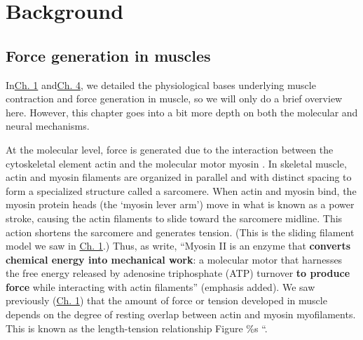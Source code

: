 \documentclass{article}
\begin{document}
\section{Background}

\subsection{Force generation in muscles}

In\href{https://curvenote.com/oxa:EPpXta8zJdzN048lz8AR/hZTnTYzQR5EQmCKX51Wj}{Ch. 1} and\href{https://curvenote.com/oxa:EPpXta8zJdzN048lz8AR/oZzZ9YkLDYhuIWC3d5Sk}{Ch. 4}, we detailed the physiological bases underlying muscle contraction and force generation in muscle, so we will only do a brief overview here. However, this chapter goes into a bit more depth on both the molecular and neural mechanisms.

At the molecular level, force is generated due to the interaction between the cytoskeletal element actin and the molecular motor myosin \citep{rassier2017sarcomere, Rassier2025Mechanisms}. In skeletal muscle, actin and myosin filaments are organized in parallel and with distinct spacing to form a specialized structure called a sarcomere. When actin and myosin bind, the myosin protein heads (the `myosin lever arm') move in what is known as a power stroke, causing the actin filaments to slide toward the sarcomere midline. This action shortens the sarcomere and generates tension. (This is the sliding filament model we saw in \href{https://curvenote.com/oxa:EPpXta8zJdzN048lz8AR/hZTnTYzQR5EQmCKX51Wj}{Ch. 1}.) Thus, as \citet{Rassier2025Mechanisms} write, ``Myosin II is an enzyme that \textbf{converts chemical energy into mechanical work}: a molecular motor that harnesses the free energy released by adenosine triphosphate (ATP) turnover \textbf{to produce force} while interacting with actin filaments'' (emphasis added). We saw previously (\href{https://curvenote.com/oxa:EPpXta8zJdzN048lz8AR/hZTnTYzQR5EQmCKX51Wj}{Ch. 1}) that the amount of force or tension developed in muscle depends on the degree of resting overlap between actin and myosin myofilaments. This is known as the length-tension relationship \citep{}Figure \%s ``.
\end{document}
